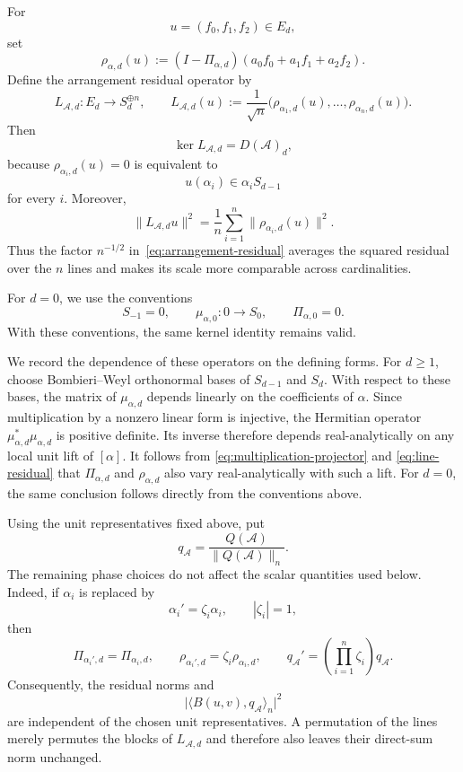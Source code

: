\documentclass[pdflatex,sn-mathphys-num]{sn-jnl}%
\theoremstyle{remark}
\theoremstyle{definition}
\begin{document}
For
\[
u=(f_0,f_1,f_2)\in E_d,
\]
set
\begin{equation}
\label{eq:line-residual}
\rho_{\alpha,d}(u)
:=
(I-\Pi_{\alpha,d})
(a_0f_0+a_1f_1+a_2f_2).
\end{equation}
Define the arrangement residual operator by
\begin{equation}
\label{eq:arrangement-residual}
L_{\mathcal{A},d}:E_d\longrightarrow S_d^{\oplus n},
\qquad
L_{\mathcal{A},d}(u)
:=
\frac{1}{\sqrt n}
\bigl(
\rho_{\alpha_1,d}(u),
\ldots,
\rho_{\alpha_n,d}(u)
\bigr).
\end{equation}
Then
\begin{equation}
\label{eq:residual-kernel}
\ker L_{\mathcal{A},d}
=
D(\mathcal{A})_d,
\end{equation}
because $\rho_{\alpha_i,d}(u)=0$ is equivalent to
\[
u(\alpha_i)\in\alpha_iS_{d-1}
\]
for every $i$. Moreover,
\begin{equation}
\label{eq:residual-energy}
\|L_{\mathcal{A},d}u\|^2
=
\frac{1}{n}
\sum_{i=1}^n
\|\rho_{\alpha_i,d}(u)\|^2.
\end{equation}
Thus the factor $n^{-1/2}$ in~\eqref{eq:arrangement-residual} averages the squared residual over the $n$ lines
and makes its scale more comparable across cardinalities.

For $d=0$, we use the conventions
\[
S_{-1}=0,
\qquad
\mu_{\alpha,0}:0\longrightarrow S_0,
\qquad
\Pi_{\alpha,0}=0.
\]
With these conventions, the same kernel identity remains valid. 

We record the dependence of these operators on the defining forms. For
$d\geq1$, choose Bombieri--Weyl orthonormal bases of $S_{d-1}$ and $S_d$.
With respect to these bases, the matrix of $\mu_{\alpha,d}$ depends linearly
on the coefficients of $\alpha$. Since multiplication by a nonzero linear
form is injective, the Hermitian operator
$\mu_{\alpha,d}^{*}\mu_{\alpha,d}$ is positive definite. Its inverse therefore
depends real-analytically on any local unit lift of $[\alpha]$. It follows
from \eqref{eq:multiplication-projector} and \eqref{eq:line-residual} that
$\Pi_{\alpha,d}$ and $\rho_{\alpha,d}$ also vary real-analytically with such
a lift. For $d=0$, the same conclusion follows directly from the conventions
above.

Using the unit representatives fixed above, put
\[
q_{\mathcal{A}}
=
\frac{Q(\mathcal{A})}{\|Q(\mathcal{A})\|_n}.
\]
The remaining phase choices do not affect the scalar quantities used below.
Indeed, if $\alpha_i$ is replaced by
\[
\alpha_i'=\zeta_i\alpha_i,
\qquad
|\zeta_i|=1,
\]
then
\[
\Pi_{\alpha_i',d}=\Pi_{\alpha_i,d},
\qquad
\rho_{\alpha_i',d}=\zeta_i\rho_{\alpha_i,d},
\qquad
q_{\mathcal{A}}'=
\left(\prod_{i=1}^n\zeta_i\right)q_{\mathcal{A}}.
\]
Consequently, the residual norms and
\[
\bigl|\langle B(u,v),q_{\mathcal{A}}\rangle_n\bigr|^2
\]
are independent of the chosen unit representatives. A permutation of the
lines merely permutes the blocks of $L_{\mathcal{A},d}$ and therefore also
leaves their direct-sum norm unchanged.
\end{document}
